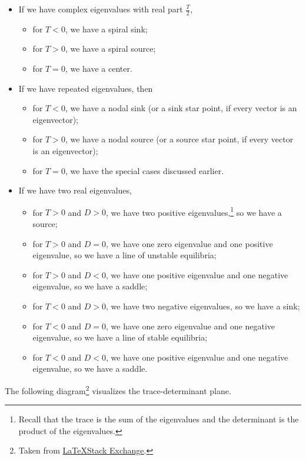 \documentclass[10pt]{mypackage}
\begin{document}
\begin{itemize}
  \item If we have complex eigenvalues with real part $\frac{T}{2}$,
    \begin{itemize}
      \item  for $T < 0$, we have a spiral sink;
      \item for $T > 0$, we have a spiral source;
      \item for $T = 0$, we have a center.
    \end{itemize}
  \item If we have repeated eigenvalues, then
    \begin{itemize}
      \item for $T < 0$, we have a nodal sink (or a sink star point, if every vector is an eigenvector);
      \item for $T > 0$, we have a nodal source (or a source star point, if every vector is an eigenvector);
      \item for $T = 0$, we have the special cases discussed earlier.
    \end{itemize}
  \item If we have two real eigenvalues,
    \begin{itemize}
      \item for $T > 0$ and $D > 0$, we have two positive eigenvalues,\footnote{Recall that the trace is the sum of the eigenvalues and the determinant is the product of the eigenvalues.} so we have a source;
      \item for $T > 0$ and $D = 0$, we have one zero eigenvalue and one positive eigenvalue, so we have a line of unstable equilibria;
      \item for $T > 0$ and $D < 0$, we have one positive eigenvalue and one negative eigenvalue, so we have a saddle;\newline

      \item for $T < 0$ and $D > 0$, we have two negative eigenvalues, so we have a sink;
      \item for $T < 0$ and $D = 0$, we have one zero eigenvalue and one negative eigenvalue, so we have a line of stable equilibria;
      \item for $T < 0$ and $D < 0$, we have one positive eigenvalue and one negative eigenvalue, so we have a saddle.
    \end{itemize}
\end{itemize}
The following diagram\footnote{Taken from \href{https://tex.stackexchange.com/questions/347201/drawing-the-trace-determinant-diagram-on-latex}{\LaTeX Stack Exchange}.} visualizes the trace-determinant plane.
\end{document}

